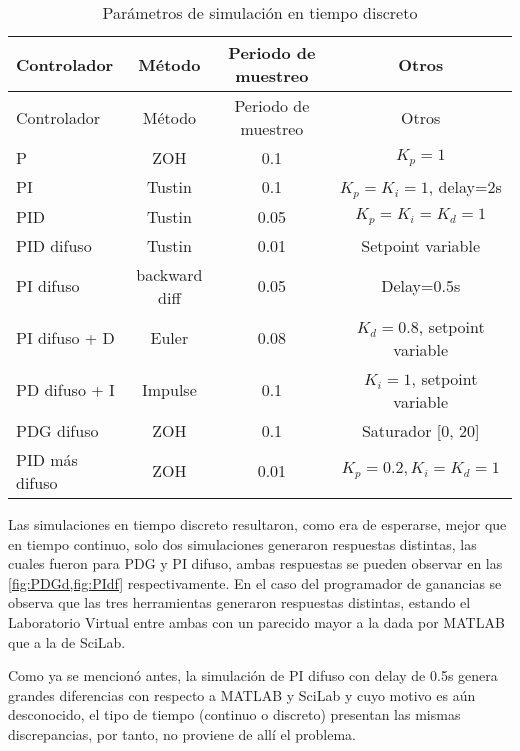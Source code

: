         {\setlength\LTleft{0pt}
        \setlength\LTright{0pt}
        \centering
        \footnotesize
        \renewcommand{\arraystretch}{0.89}
        \begin{longtable}{l @{\extracolsep{\fill}} ccc}
            \caption[Parámetros de simulación en tiempo discreto]{Parámetros de simulación en tiempo discreto} 
            \label{tab:parametrosD} \\
            \toprule
            Controlador  & Método & Periodo de muestreo & Otros       \\ \midrule
            \endfirsthead
            \toprule
            Controlador  & Método & Periodo de muestreo & Otros       \\ \midrule
            \endhead
            \bottomrule
            \endfoot
            P              & ZOH           & 0.1  & $K_p=1$                      \\
            PI             & Tustin        & 0.1  & $K_p=K_i=1$, delay=2s        \\
            PID            & Tustin        & 0.05 & $K_p=K_i=K_d=1$              \\
            PID difuso     & Tustin        & 0.01 & Setpoint variable            \\
            PI difuso      & backward diff & 0.05 & Delay=0.5s                   \\
            PI difuso + D  & Euler         & 0.08 & $K_d=0.8$, setpoint variable \\
            PD difuso + I  & Impulse       & 0.1  & $K_i=1$, setpoint variable   \\
            PDG difuso     & ZOH           & 0.1  & Saturador [0, 20]            \\
            PID más difuso & ZOH           & 0.01 & $K_p=0.2, K_i=K_d=1$         \\
        \end{longtable}}

        Las simulaciones en tiempo discreto resultaron, como era de esperarse, mejor que en tiempo continuo, solo dos simulaciones generaron respuestas distintas, las cuales fueron para PDG y PI difuso, ambas respuestas se pueden observar en las \cref{fig:PDGd,fig:PIdf} respectivamente. En el caso del programador de ganancias se observa que las tres herramientas generaron respuestas distintas, estando el Laboratorio Virtual entre ambas con un parecido mayor a la dada por MATLAB que a la de SciLab.

        Como ya se mencionó antes, la simulación de PI difuso con delay de 0.5s genera grandes diferencias con respecto a MATLAB y SciLab y cuyo motivo es aún desconocido, el tipo de tiempo (continuo o discreto) presentan las mismas discrepancias, por tanto, no proviene de allí el problema.

